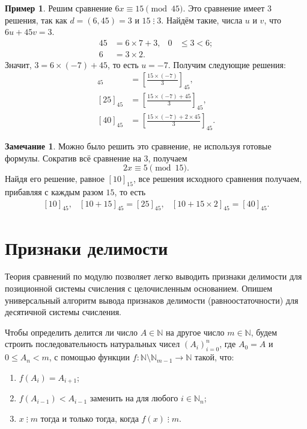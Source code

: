 \documentclass[14pt, a4paper]{extarticle}
\theoremstyle{definition}
\newtheorem*{remark}{Замечание}
\newtheorem{example}{Пример}
\newcommand{\divisible}{\mathop{\vdots}}
\begin{document}
	\begin{example}
		Решим сравнение $6x\equiv15\pmod{45}$. Это сравнение имеет $3$ решения, так как $d=(6,45)=3$ и $15\divisible3$. Найдём такие, числа $u$ и $v$, что $6u+45v=3$.
		\begin{align*}
			45&=6\times7+3,&0&\leqslant3<6;\\
			6&=3\times2.
		\end{align*}
		Значит, $3=6\times(-7)+45$, то есть $u=-7$. Получим следующие решения:
		\begin{align*}
			[10]_{45}&=\left[\frac{15\times(-7)}{3}\right]_{45},\\
			[25]_{45}&=\left[\frac{15\times(-7)+45}{3}\right]_{45},\\
			[40]_{45}&=\left[\frac{15\times(-7)+2\times45}{3}\right]_{45}.
		\end{align*}
	\end{example}
	
	\begin{remark}
		Можно было решить это сравнение, не используя готовые формулы. Сократив всё сравнение на $3$, получаем
		$$2x\equiv5\pmod{15}.$$
		Найдя его решение, равное $[10]_{15}$, все решения исходного сравнения получаем, прибавляя с каждым разом $15$, то есть
		$$\begin{array}{ccc}
			[10]_{45},&[10+15]_{45}=[25]_{45},&[10+15\times2]_{45}=[40]_{45}.
		\end{array}$$
	\end{remark}

\newpage
\section{Признаки делимости}

	Теория сравнений по модулю позволяет легко выводить признаки делимости для позиционной системы счисления с целочисленным основанием. Опишем универсальный алгоритм вывода признаков делимости (равноостаточности) для десятичной системы счисления.
	
	Чтобы определить делится ли число $A\in\mathbb{N}$ на другое число \mbox{$m\in\mathbb{N}$}, будем строить последовательность натуральных чисел $(A_i)_{i=0}^n$, где $A_0=A$ и $0\leqslant A_n<m$, с помощью функции $f\colon\mathbb{N}\setminus\mathbb{N}_{m-1}\to\mathbb{N}$ такой, что:
	\begin{enumerate}
		\item $f(A_i)=A_{i+1}$;
		\item $f(A_{i-1})<A_{i-1}$ заменить на для любого $i\in\mathbb{N}_n$;
		\item $x\divisible m$ тогда и только тогда, когда $f(x)\divisible m$.
	\end{enumerate}
\end{document}
